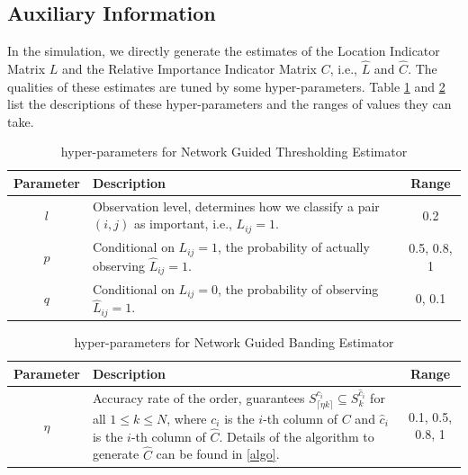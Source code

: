 \subsection{Auxiliary Information}
In the simulation, we directly generate the estimates of the Location Indicator Matrix $L$ and the Relative Importance Indicator Matrix $C$, i.e., $\hat L$ and $\hat C$. The qualities of these estimates are tuned by some hyper-parameters. Table \ref{param-hatL} and \ref{param-hatC} list the descriptions of these hyper-parameters and the ranges of values they can take.
\begin{table}[htbp]
     \centering
     \begin{tabularx}{\textwidth}{c|X|c}
          \toprule
          Parameter & Description & Range \\ 
          \midrule
          \(l\) & Observation level, determines how we classify a pair \((i,j)\) as important, i.e., \(L_{ij} =1\). & 0.2 \\
          \(p\) & Conditional on \(L_{ij} =1\), the probability of actually observing \(\hat{L}_{ij} =1\). & 0.5, 0.8, 1 \\
          \(q\) & Conditional on \(L_{ij} = 0\), the probability of  observing \(\hat{L}_{ij} =1\). & 0, 0.1 \\
          \bottomrule
     \end{tabularx}
     \caption{hyper-parameters for Network Guided Thresholding Estimator}
     \label{param-hatL}
\end{table}
\vspace{10mm}
\begin{table}[htbp]
     \centering
     \begin{tabularx}{\textwidth}{c|X|c}
          \toprule
          Parameter & Description & Range \\ 
          \midrule
          $\eta$ & Accuracy rate of the order,  guarantees $S^{c_i}_{\lceil \eta k \rceil} \subseteq S^{\hat{c}_i}_{k}$ for all $1 \le k \le N$, where $c_i$ is the $i$-th column of $C$ and $\hat{c}_i$ is the $i$-th column of $\hat C$. Details of the algorithm to generate $\hat C$ can be found in \autoref{algo}.  & 0.1, 0.5, 0.8, 1 \\
          \bottomrule
     \end{tabularx}
     \caption{hyper-parameters for Network Guided Banding Estimator}
     \label{param-hatC}
\end{table}

